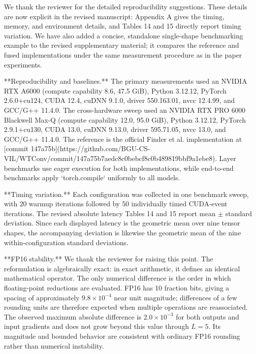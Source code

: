 \documentclass[11pt]{article}
\begin{document}
\begin{markdown}
We thank the reviewer for the detailed reproducibility suggestions. These details are now explicit in the revised manuscript: Appendix A gives the timing, memory, and environment details, and Tables 14 and 15 directly report timing variation. We have also added a concise, standalone single-shape benchmarking example to the revised supplementary material; it compares the reference and fused implementations under the same measurement procedure as in the paper experiments.

**Reproducibility and baselines.** The primary measurements used an NVIDIA RTX A6000 (compute capability 8.6, 47.5 GiB), Python 3.12.12, PyTorch 2.6.0+cu124, CUDA 12.4, cuDNN 9.1.0, driver 550.163.01, nvcc 12.4.99, and GCC/G++ 11.4.0. The cross-hardware sweep used an NVIDIA RTX PRO 6000 Blackwell Max-Q (compute capability 12.0, 95.0 GiB), Python 3.12.12, PyTorch 2.9.1+cu130, CUDA 13.0, cuDNN 9.13.0, driver 595.71.05, nvcc 13.0, and GCC/G++ 11.4.0. The reference is the official Finder et al. implementation at [commit 147a75b](https://github.com/BGU-CS-VIL/WTConv/commit/147a75b7aedc8c0bebcf8c0b489819bbf9a1ebe8). Layer benchmarks use eager execution for both implementations, while end-to-end benchmarks apply `torch.compile` uniformly to all models.

**Timing variation.** Each configuration was collected in one benchmark sweep, with 20 warmup iterations followed by 50 individually timed CUDA-event iterations. The revised absolute latency Tables 14 and 15 report mean $\pm$ standard deviation. Since each displayed latency is the geometric mean over nine tensor shapes, the accompanying deviation is likewise the geometric mean of the nine within-configuration standard deviations.

**FP16 stability.** We thank the reviewer for raising this point. The reformulation is algebraically exact: in exact arithmetic, it defines an identical mathematical operator. The only numerical difference is the order in which floating-point reductions are evaluated. FP16 has 10 fraction bits, giving a spacing of approximately $9.8\times10^{-4}$ near unit magnitude; differences of a few rounding units are therefore expected when multiple operations are reassociated. The observed maximum absolute difference is $2.0\times10^{-3}$ for both outputs and input gradients and does not grow beyond this value through $L=5$. Its magnitude and bounded behavior are consistent with ordinary FP16 rounding rather than numerical instability.


\end{markdown}
\end{document}
